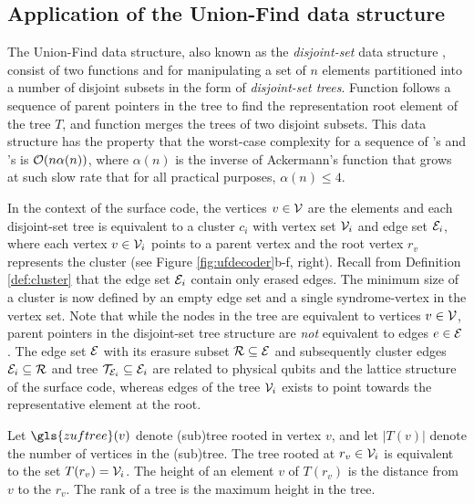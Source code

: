 \subsection{Application of the Union-Find data structure}\label{sec:ufdata}
The Union-Find data structure, also known as the \emph{disjoint-set} data structure \cite{tarjan1975efficiency}, consist of two functions  and  for manipulating a set of $n$ elements partitioned into a number of disjoint subsets in the form of \emph{disjoint-set trees}. Function  follows a sequence of parent pointers in the tree to find the representation root element of the tree $T$, and function  merges the trees of two disjoint subsets. This data structure has the property that the worst-case complexity for a sequence of 's and 's is $\mathcal{O}(n\alpha(n))$, where $\alpha(n)$ is the inverse of Ackermann's function that grows at such slow rate that for all practical purposes, $\alpha(n)\leq 4$. 

In the context of the surface code, the vertices $v\in \mathcal{V}$ are the elements and each disjoint-set tree is equivalent to a cluster $c_i$ with vertex set $\mathcal{V}_i$ and edge set $\mathcal{E}_i$, where each vertex $v\in \mathcal{V}_i$ points to a parent vertex and the root vertex $r_v$ represents the cluster (see Figure \ref{fig:ufdecoder}b-f, right). Recall from Definition \ref{def:cluster} that the edge set $\mathcal{E}_i$ contain only erased edges.
The minimum size of a cluster is now defined by an empty edge set and a single syndrome-vertex in the vertex set. Note that while the nodes in the tree are equivalent to vertices $v \in \mathcal{V}$, parent pointers in the disjoint-set tree structure are \emph{not} equivalent to edges $e\in \mathcal{E}$. The edge set $\mathcal{E}$ with its erasure subset $\mathcal{R}\subseteq \mathcal{E}$ and subsequently cluster edges $\mathcal{E}_i\subseteq \mathcal{R}$ and tree $\mathcal{T}_{\mathcal{E}_i}\subseteq \mathcal{E}_i$ are related to physical qubits and the lattice structure of the surface code, whereas edges of the tree $\mathcal{V}_i$ exists to point towards the representative element at the root.
\begin{definition}\label{def:trees}
  Let $\gls{zuftree}(v)$ denote (sub)tree rooted in vertex $v$, and let $|T(v)|$ denote the number of vertices in the (sub)tree. The tree rooted at $r_v\in \mathcal{V}_i$ is equivalent to the set $T(r_v)=\mathcal{V}_i$. The height of an element $v$ of $T(r_v)$ is the distance from $v$ to the $r_v$. The rank of a tree is the maximum height in the tree. 
\end{definition}

